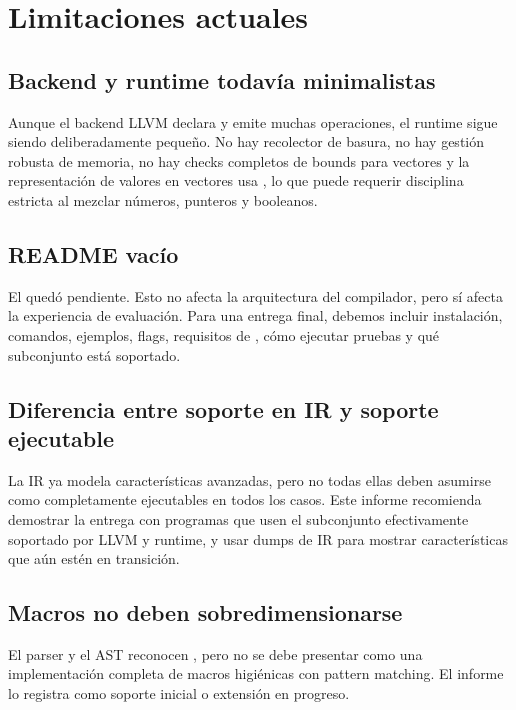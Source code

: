 \documentclass[12pt,letterpaper]{article}
\newcommand{\repo}[1]{\texttt{\detokenize{#1}}}
\begin{document}
\section{Limitaciones actuales}

\subsection{Backend y runtime todavía minimalistas}

Aunque el backend LLVM declara y emite muchas operaciones, el runtime sigue siendo deliberadamente pequeño. No hay recolector de basura, no hay gestión robusta de memoria, no hay checks completos de bounds para vectores y la representación de valores en vectores usa \repo{int64_t}, lo que puede requerir disciplina estricta al mezclar números, punteros y booleanos.

\subsection{README vacío}

El \repo{README.md} quedó pendiente. Esto no afecta la arquitectura del compilador, pero sí afecta la experiencia de evaluación. Para una entrega final, debemos incluir instalación, comandos, ejemplos, flags, requisitos de \repo{clang}, cómo ejecutar pruebas y qué subconjunto está soportado.

\subsection{Diferencia entre soporte en IR y soporte ejecutable}

La IR ya modela características avanzadas, pero no todas ellas deben asumirse como completamente ejecutables en todos los casos. Este informe recomienda demostrar la entrega con programas que usen el subconjunto efectivamente soportado por LLVM y runtime, y usar dumps de IR para mostrar características que aún estén en transición.

\subsection{Macros no deben sobredimensionarse}

El parser y el AST reconocen \repo{define}, pero no se debe presentar como una implementación completa de macros higiénicas con pattern matching. El informe lo registra como soporte inicial o extensión en progreso.
\end{document}
